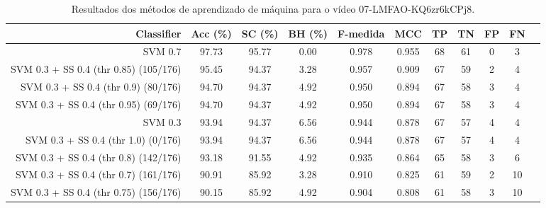 \begin{table}[!htb]
\centering
\caption{Resultados dos métodos de aprendizado de máquina para o vídeo 07-LMFAO-KQ6zr6kCPj8.}
\label{tab:07-LMFAO-KQ6zr6kCPj8}
\begin{tabular}{r|c|c|c|c|c|c|c|c|c|c}
\hline\hline
Classifier & Acc (\%) & SC (\%) & BH (\%) & F-medida & MCC & TP & TN & FP & FN \\ \hline
SVM 0.7 & 97.73 & 95.77 & 0.00 & 0.978 & 0.955 & 68 & 61 & 0 & 3 \\ 
SVM 0.3 + SS 0.4 (thr 0.85) (105/176) & 95.45 & 94.37 & 3.28 & 0.957 & 0.909 & 67 & 59 & 2 & 4 \\ 
SVM 0.3 + SS 0.4 (thr 0.9) (80/176) & 94.70 & 94.37 & 4.92 & 0.950 & 0.894 & 67 & 58 & 3 & 4 \\ 
SVM 0.3 + SS 0.4 (thr 0.95) (69/176) & 94.70 & 94.37 & 4.92 & 0.950 & 0.894 & 67 & 58 & 3 & 4 \\ 
SVM 0.3 & 93.94 & 94.37 & 6.56 & 0.944 & 0.878 & 67 & 57 & 4 & 4 \\ 
SVM 0.3 + SS 0.4 (thr 1.0) (0/176) & 93.94 & 94.37 & 6.56 & 0.944 & 0.878 & 67 & 57 & 4 & 4 \\ 
SVM 0.3 + SS 0.4 (thr 0.8) (142/176) & 93.18 & 91.55 & 4.92 & 0.935 & 0.864 & 65 & 58 & 3 & 6 \\ 
SVM 0.3 + SS 0.4 (thr 0.7) (161/176) & 90.91 & 85.92 & 3.28 & 0.910 & 0.825 & 61 & 59 & 2 & 10 \\ 
SVM 0.3 + SS 0.4 (thr 0.75) (156/176) & 90.15 & 85.92 & 4.92 & 0.904 & 0.808 & 61 & 58 & 3 & 10 \\ 
\hline\hline
\end{tabular}
\end{table}
